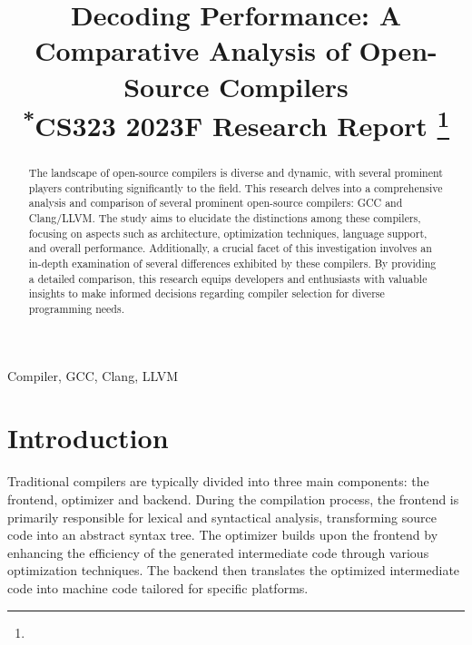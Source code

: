 \documentclass[conference]{IEEEtran}
\begin{document}
\title{Decoding Performance: A Comparative Analysis of Open-Source Compilers\\
{\footnotesize \textsuperscript{*}CS323 2023F Research Report}
\thanks{}
}

\author{
\and
{}
\and
{}
}
\maketitle

\begin{abstract}
The landscape of open-source compilers is diverse and dynamic, with several prominent players contributing significantly to the field. This research delves into a comprehensive analysis and comparison of several prominent open-source compilers: GCC and Clang/LLVM. The study aims to elucidate the distinctions among these compilers, focusing on aspects such as architecture, optimization techniques, language support, and overall performance. Additionally, a crucial facet of this investigation involves an in-depth examination of several differences exhibited by these compilers. By providing a detailed comparison, this research equips developers and enthusiasts with valuable insights to make informed decisions regarding compiler selection for diverse programming needs.
\end{abstract}

\begin{IEEEkeywords}
Compiler, GCC, Clang, LLVM
\end{IEEEkeywords}

\section{Introduction}
Traditional compilers are typically divided into three main components: the frontend, optimizer and backend. During the compilation process, the frontend is primarily responsible for lexical and syntactical analysis, transforming source code into an abstract syntax tree. The optimizer builds upon the frontend by enhancing the efficiency of the generated intermediate code through various optimization techniques. The backend then translates the optimized intermediate code into machine code tailored for specific platforms.
\end{document}
